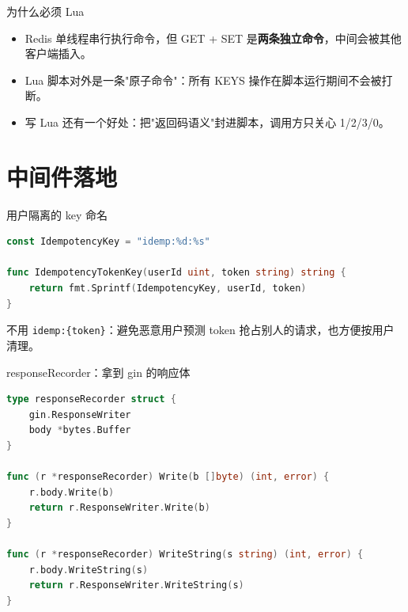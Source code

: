 \begin{frame}{为什么必须 Lua}
\begin{itemize}
  \item Redis 单线程串行执行命令，但 GET + SET 是\textbf{两条独立命令}，中间会被其他客户端插入。
  \item Lua 脚本对外是一条"原子命令"：所有 KEYS 操作在脚本运行期间不会被打断。
  \item 写 Lua 还有一个好处：把"返回码语义"封进脚本，调用方只关心 1/2/3/0。
\end{itemize}
\vspace{2mm}
\end{frame}

\section{中间件落地}

\begin{frame}[fragile]{用户隔离的 key 命名}
\begin{lstlisting}[language=Go,firstnumber=15,
  caption={\srcnote{repository/cache/key.go:15--21}}]
const IdempotencyKey = "idemp:%d:%s"

func IdempotencyTokenKey(userId uint, token string) string {
    return fmt.Sprintf(IdempotencyKey, userId, token)
}
\end{lstlisting}
\vspace{1mm}
\small 不用 \texttt{idemp:\{token\}}：避免恶意用户预测 token 抢占别人的请求，也方便按用户清理。
\end{frame}

\begin{frame}[fragile]{responseRecorder：拿到 gin 的响应体}
\begin{lstlisting}[language=Go,firstnumber=18,
  caption={\srcnote{middleware/idempotency.go:18--31}}]
type responseRecorder struct {
    gin.ResponseWriter
    body *bytes.Buffer
}

func (r *responseRecorder) Write(b []byte) (int, error) {
    r.body.Write(b)
    return r.ResponseWriter.Write(b)
}

func (r *responseRecorder) WriteString(s string) (int, error) {
    r.body.WriteString(s)
    return r.ResponseWriter.WriteString(s)
}
\end{lstlisting}
\end{frame}

